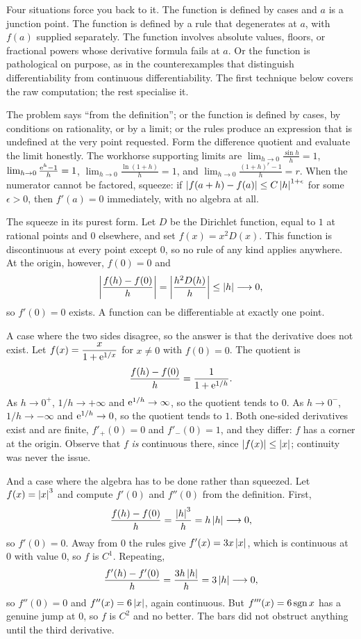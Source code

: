 Four situations force you back to it. The function is defined by cases and $a$ is a junction point. The function is defined by a rule that degenerates at $a$, with $f(a)$ supplied separately. The function involves absolute values, floors, or fractional powers whose derivative formula fails at $a$. Or the function is pathological on purpose, as in the counterexamples that distinguish differentiability from continuous differentiability. The first technique below covers the raw computation; the rest specialise it.

\cue The problem says ``from the definition''; or the function is defined by cases, by conditions on rationality, or by a limit; or the rules produce an expression that is undefined at the very point requested.
\method Form the difference quotient and evaluate the limit honestly. The workhorse supporting limits are $\lim_{h\to0}\frac{\sin h}{h}=1$, $\lim_{h\to0}\frac{\mathrm{e}^{h}-1}{h}=1$, $\lim_{h\to0}\frac{\ln(1+h)}{h}=1$, and $\lim_{h\to0}\frac{(1+h)^{r}-1}{h}=r$. When the numerator cannot be factored, squeeze: if $\left\lvert f(a+h)-f(a)\right\rvert\leq C\left\lvert h\right\rvert^{1+\epsilon}$ for some $\epsilon>0$, then $f'(a)=0$ immediately, with no algebra at all.

\begin{worked}
The squeeze in its purest form. Let $D$ be the Dirichlet function, equal to $1$ at rational points and $0$ elsewhere, and set $f(x)=x^{2}D(x)$. This function is discontinuous at every point except $0$, so no rule of any kind applies anywhere. At the origin, however, $f(0)=0$ and
\[
\left|\frac{f(h)-f(0)}{h}\right|=\left|\frac{h^{2}D(h)}{h}\right|\leq\left\lvert h\right\rvert\longrightarrow0 ,
\]
so $f'(0)=0$ exists. A function can be differentiable at exactly one point.

A case where the two sides disagree, so the answer is that the derivative does not exist. Let $f(x)=\dfrac{x}{1+\mathrm{e}^{1/x}}$ for $x\neq0$ with $f(0)=0$. The quotient is
\[
\frac{f(h)-f(0)}{h}=\frac{1}{1+\mathrm{e}^{1/h}} .
\]
As $h\to0^{+}$, $1/h\to+\infty$ and $\mathrm{e}^{1/h}\to\infty$, so the quotient tends to $0$. As $h\to0^{-}$, $1/h\to-\infty$ and $\mathrm{e}^{1/h}\to0$, so the quotient tends to $1$. Both one-sided derivatives exist and are finite, $f'_{+}(0)=0$ and $f'_{-}(0)=1$, and they differ: $f$ has a corner at the origin. Observe that $f$ \emph{is} continuous there, since $\left\lvert f(x)\right\rvert\leq\left\lvert x\right\rvert$; continuity was never the issue.

And a case where the algebra has to be done rather than squeezed. Let $f(x)=\left\lvert x\right\rvert^{3}$ and compute $f'(0)$ and $f''(0)$ from the definition. First,
\[
\frac{f(h)-f(0)}{h}=\frac{\left\lvert h\right\rvert^{3}}{h}=h\left\lvert h\right\rvert\longrightarrow0 ,
\]
so $f'(0)=0$. Away from $0$ the rules give $f'(x)=3x\left\lvert x\right\rvert$, which is continuous at $0$ with value $0$, so $f$ is $C^{1}$. Repeating,
\[
\frac{f'(h)-f'(0)}{h}=\frac{3h\left\lvert h\right\rvert}{h}=3\left\lvert h\right\rvert\longrightarrow0 ,
\]
so $f''(0)=0$ and $f''(x)=6\left\lvert x\right\rvert$, again continuous. But $f'''(x)=6\operatorname{sgn} x$ has a genuine jump at $0$, so $f$ is $C^{2}$ and no better. The bars did not obstruct anything until the third derivative.
\end{worked}

